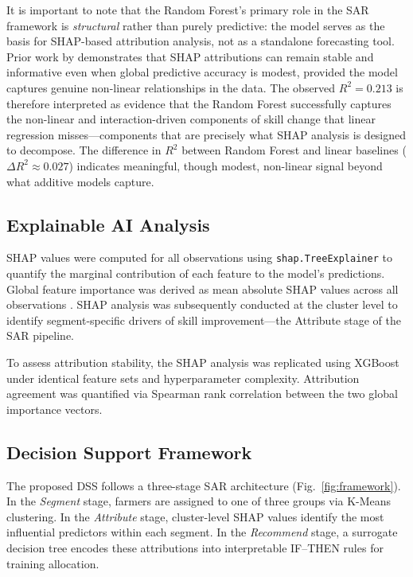 \documentclass[3p,twocolumn,authoryear]{elsarticle}
\begin{document}
It is important to note that the Random Forest's primary role in the SAR
framework is \textit{structural} rather than purely predictive: the model
serves as the basis for SHAP-based attribution analysis, not as a
standalone forecasting tool.
Prior work by \citet{lundberg2020} demonstrates that SHAP attributions
can remain stable and informative even when global predictive accuracy is
modest, provided the model captures genuine non-linear relationships in
the data.
The observed $R^{2} = 0.213$ is therefore interpreted as evidence that
the Random Forest successfully captures the non-linear and
interaction-driven components of skill change that linear regression
misses---components that are precisely what SHAP analysis is designed to
decompose.
The difference in $R^{2}$ between Random Forest and linear baselines
($\Delta R^{2} \approx 0.027$) indicates meaningful, though modest,
non-linear signal beyond what additive models capture.

\subsection{Explainable AI Analysis}

SHAP values were computed for all observations using
\texttt{shap.TreeExplainer} \citep{lundberg2017} to quantify the
marginal contribution of each feature to the model's predictions.
Global feature importance was derived as mean absolute SHAP values across
all observations \citep{lundberg2020}.
SHAP analysis was subsequently conducted at the cluster level to identify
segment-specific drivers of skill improvement---the Attribute stage of
the SAR pipeline.

To assess attribution stability, the SHAP analysis was replicated using
XGBoost \citep{chen2016} under identical feature sets and hyperparameter
complexity.
Attribution agreement was quantified via Spearman rank correlation
between the two global importance vectors.

\subsection{Decision Support Framework}

The proposed DSS follows a three-stage SAR architecture
(Fig.~\ref{fig:framework}).
In the \textit{Segment} stage, farmers are assigned to one of three
groups via K-Means clustering.
In the \textit{Attribute} stage, cluster-level SHAP values identify the
most influential predictors within each segment.
In the \textit{Recommend} stage, a surrogate decision tree encodes these
attributions into interpretable IF--THEN rules for training allocation.
\end{document}
